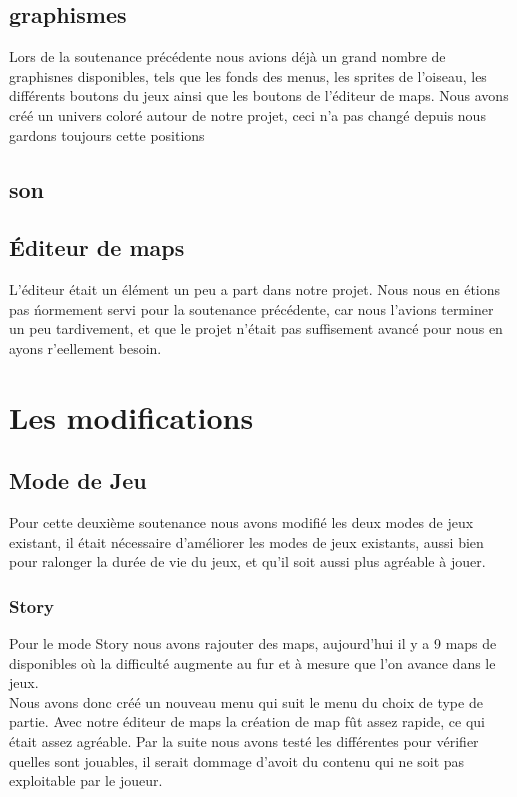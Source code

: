 \documentclass [11pt]{report}
\begin{document}
	\section{graphismes}
		Lors de la soutenance pr\'ec\'edente nous avions d\'ej\`a un grand nombre de graphisnes disponibles, tels que les fonds des menus, les sprites de l'oiseau, les diff\'erents boutons du jeux ainsi que les boutons de l'\'editeur de maps. Nous avons cr\'e\'e un univers color\'e autour de notre projet, ceci n'a pas chang\'e depuis nous gardons toujours cette positions 
	\section{son}
	\section{\'Editeur de maps}
		L'\'editeur \'etait un \'el\'ement un peu a part dans notre projet. Nous nous en \'etions pas \'normement servi pour la soutenance pr\'ec\'edente, car nous l'avions terminer un peu tardivement, et que le projet n'\'etait pas suffisement avanc\'e pour nous en ayons r'eellement besoin.
\chapter{Les modifications}
	\section{Mode de Jeu}
		Pour cette deuxi\`eme soutenance nous avons modifi\'e les deux modes de jeux existant, il \'etait n\'ecessaire d'am\'eliorer les modes de jeux existants, aussi bien pour ralonger la dur\'ee de vie du jeux, et qu'il soit aussi plus agr\'eable \`a jouer.
		\subsection{Story}
			Pour le mode Story nous avons rajouter des maps, aujourd'hui il y a 9 maps de disponibles o\`u la difficult\'e augmente au fur et \`a mesure que l'on avance dans le jeux. \\
			\indent Nous avons donc cr\'e\'e un nouveau menu qui suit le menu du choix de type de partie. Avec notre \'editeur de maps la cr\'eation de map f\^ut assez rapide, ce qui \'etait assez agr\'eable. Par la suite nous avons test\'e les diff\'erentes pour v\'erifier quelles sont jouables, il serait dommage d'avoit du contenu qui ne soit pas exploitable par le joueur.
\end{document}
